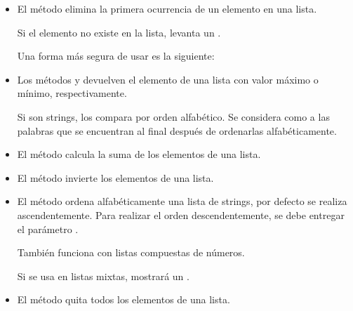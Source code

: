 \begin{itemize}
  \item El método  elimina la primera ocurrencia de un elemento en una lista.
  

  Si el elemento no existe en la lista, levanta un .


  Una forma más segura de usar  es la siguiente:


  \item Los métodos  y  devuelven el elemento de una lista con valor máximo o mínimo, respectivamente.


  Si son strings, los compara por orden alfabético. Se considera como  a las palabras que se encuentran al final después de ordenarlas alfabéticamente.


  \item El método  calcula la suma de los elementos de una lista.
  

  \item El método  invierte los elementos de una lista.
  

  \item El método  ordena alfabéticamente una lista de strings, por defecto se realiza ascendentemente. Para realizar el orden descendentemente, se debe entregar el parámetro .
  
  
  También funciona con listas compuestas de números.


  Si se usa en listas mixtas, mostrará un .


  \item El método  quita todos los elementos de una lista.


\end{itemize}

